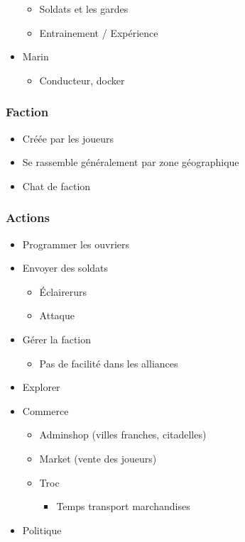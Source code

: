 \documentclass[
]{article}
\providecommand{\tightlist}{%
  \setlength{\itemsep}{0pt}\setlength{\parskip}{0pt}}
\begin{document}
\begin{itemize}
  \begin{itemize}
  \tightlist
  \item
    Soldats et les gardes
  \item
    Entrainement / Expérience
  \end{itemize}
\item
  Marin

  \begin{itemize}
  \tightlist
  \item
    Conducteur, docker
  \end{itemize}
\end{itemize}

\hypertarget{faction}{%
\subsubsection{Faction}\label{faction}}

\begin{itemize}
\tightlist
\item
  Créée par les joueurs
\item
  Se rassemble généralement par zone géographique
\item
  Chat de faction
\end{itemize}

\hypertarget{actions}{%
\subsubsection{Actions}\label{actions}}

\begin{itemize}
\tightlist
\item
  Programmer les ouvriers
\item
  Envoyer des soldats

  \begin{itemize}
  \tightlist
  \item
    Éclairerurs
  \item
    Attaque
  \end{itemize}
\item
  Gérer la faction

  \begin{itemize}
  \tightlist
  \item
    Pas de facilité dans les alliances
  \end{itemize}
\item
  Explorer
\item
  Commerce

  \begin{itemize}
  \tightlist
  \item
    Adminshop (villes franches, citadelles)
  \item
    Market (vente des joueurs)
  \item
    Troc

    \begin{itemize}
    \tightlist
    \item
      Temps transport marchandises
    \end{itemize}
  \end{itemize}
\item
  Politique
\end{itemize}
\end{document}
